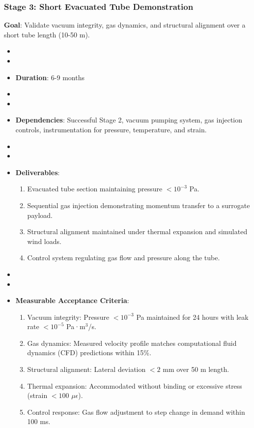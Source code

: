 \subsubsection{Stage 3: Short Evacuated Tube Demonstration}
\textbf{Goal}: Validate vacuum integrity, gas dynamics, and structural alignment over a short tube length (10-50 m).
\begin{itemize}
    \item \item \item \textbf{Duration}: 6-9 months
    \item \item \item \textbf{Dependencies}: Successful Stage 2, vacuum pumping system, gas injection controls, instrumentation for pressure, temperature, and strain.
    \item \item \item \textbf{Deliverables}:
        \begin{enumerate}
            \item Evacuated tube section maintaining pressure $< 10^{-3}$ Pa.
            \item Sequential gas injection demonstrating momentum transfer to a surrogate payload.
            \item Structural alignment maintained under thermal expansion and simulated wind loads.
            \item Control system regulating gas flow and pressure along the tube.
        \end{enumerate}
    \item \item \item \textbf{Measurable Acceptance Criteria}:
        \begin{enumerate}
            \item Vacuum integrity: Pressure $< 10^{-3}$ Pa maintained for 24 hours with leak rate $< 10^{-5}$ Pa·m$^3$/s.
            \item Gas dynamics: Measured velocity profile matches computational fluid dynamics (CFD) predictions within 15\%.
            \item Structural alignment: Lateral deviation $< 2$ mm over 50 m length.
            \item Thermal expansion: Accommodated without binding or excessive stress (strain $< 100$ $\mu\epsilon$).
            \item Control response: Gas flow adjustment to step change in demand within 100 ms.

\end{enumerate}
\end{itemize}
